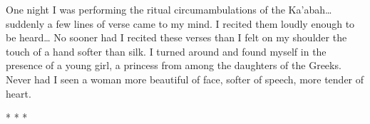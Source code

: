 \begin{quotex}
One night I was performing the ritual circumambulations of the Ka'abah… suddenly a few lines of verse came to my mind. I recited them loudly enough to be heard… No sooner had I recited these verses than I felt on my shoulder the touch of a hand softer than silk. I turned around and found myself in the presence of a young girl, a princess from among the daughters of the Greeks. Never had I seen a woman more beautiful of face, softer of speech, more tender of heart. 

\end{quotex}



\begin{center}* * *\end{center}

